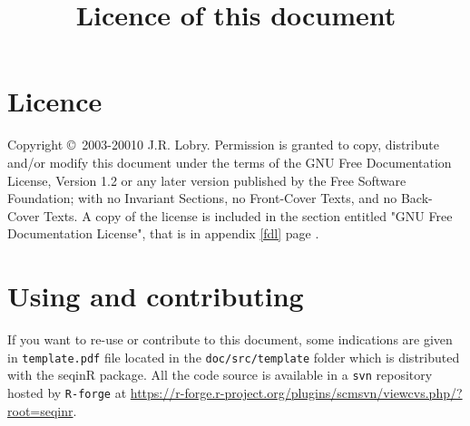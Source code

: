 \title{Licence of this document}
\section*{Licence}

    Copyright \copyright~2003-20010 J.R. Lobry.
    Permission is granted to copy, distribute and/or modify this document
    under the terms of the GNU Free Documentation License, Version 1.2
    or any later version published by the Free Software Foundation;
    with no Invariant Sections, no Front-Cover Texts, and no Back-Cover Texts.
    A copy of the license is included in the section entitled "GNU
    Free Documentation License", that is in appendix \ref{fdl} page \pageref{fdl}.

\section*{Using and contributing}

If you want to re-use or contribute to this document, some indications are
given in \texttt{template.pdf} file located in the \texttt{doc/src/template}
folder which is distributed with the seqinR package. All the code source
is available in a \texttt{svn} repository hosted by \texttt{R-forge} at
\url{https://r-forge.r-project.org/plugins/scmsvn/viewcvs.php/?root=seqinr}.

